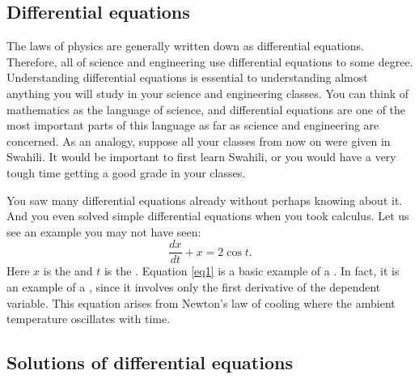 \documentclass[12pt]{book}
\begin{document}

\subsection{Differential equations}

The laws of physics are generally written down as differential
equations.  Therefore, all of science and engineering use
differential equations to some degree.  Understanding
differential equations is essential to understanding almost anything you will
study in your science and engineering classes.
You can think of mathematics as the language of science, and
differential equations are one of the most important parts of this
language as far as science and engineering are concerned.  As an analogy,
suppose all your classes from now on were given in Swahili.  
It would be important to first learn Swahili, or you would have a very
tough time getting a good grade in your classes.

You saw many
differential equations already without perhaps knowing about it.
And you even solved simple
differential equations when you took calculus.
Let us see an example you may not have seen:
\begin{equation} \label{eq1}
\frac{dx}{dt} + x = 2 \cos t .
\end{equation}
Here $x$ is the \emph{} and $t$ is the
\emph{}.
Equation \eqref{eq1}
is a basic example of a \emph{}.  In fact, it
is an example of a \emph{}, since
it involves only the first derivative of the dependent variable.  This 
equation arises from Newton's law of cooling where the ambient
temperature oscillates with time.

\subsection{Solutions of differential equations}
\end{document}
